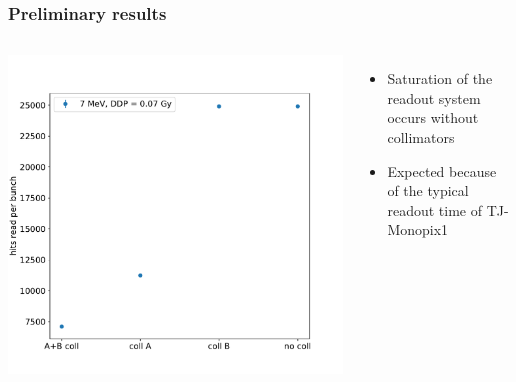     \begin{frame}
        \frametitle{Preliminary results}
        \begin{columns}
                \includegraphics[width=1.1\linewidth]{figures/test_beam/hits.pdf}  
                \begin{itemize}
                    \item Saturation of the readout system occurs without collimators
                    \item Expected because of the typical readout time of TJ-Monopix1
                \end{itemize}
            \end{columns}
        \end{frame}  